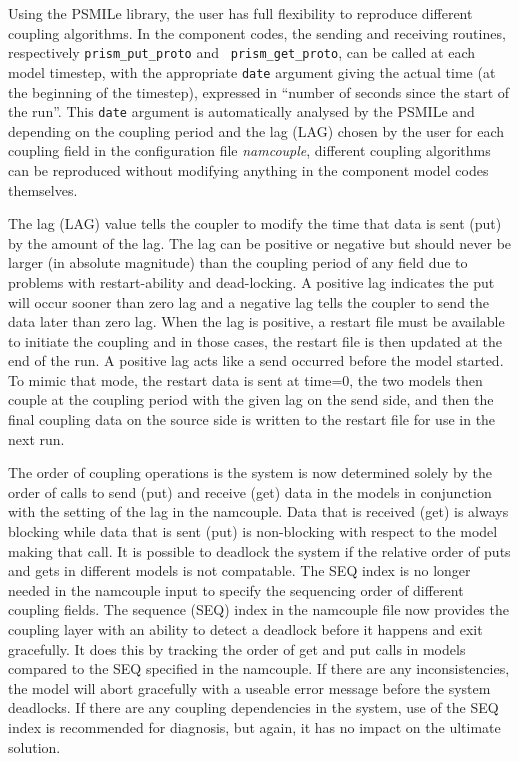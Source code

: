 Using the PSMILe library, the user has full flexibility to reproduce
different coupling algorithms. In the component codes, the sending and
receiving routines, respectively {\tt prism\_put\_proto} and {\tt
  prism\_get\_proto}, can be called at each model timestep, with the
appropriate {\tt date} argument giving the actual time (at the
beginning of the timestep), expressed in ``number of seconds since the
start of the run''. This {\tt date} argument is automatically analysed
by the PSMILe
and depending on the coupling period and the lag (LAG) chosen by the 
user for each coupling field in the configuration file {\it namcouple}, different
coupling algorithms can be reproduced without modifying anything in the
component model codes themselves. 

The lag (LAG) value tells the coupler to modify the time that data
is sent (put) by the amount of the lag.  The lag can be positive or
negative but should never be larger (in absolute magnitude) than the
coupling period of any field due to problems with restart-ability and
dead-locking.  A positive lag indicates the
put will occur sooner than zero lag and a negative lag tells the coupler
to send the data later than zero lag.  When the lag is positive, 
a restart file must be available to initiate the coupling and in those cases, 
the restart file is then updated at the end of the run.  A positive
lag acts like a send occurred before the model started.  To mimic that
mode, the restart data is sent at time=0, the two models then couple at the coupling
period with the given lag on the send side, and then the final coupling
data on the source side is written to the restart file for use in the
next run.  

The order of coupling operations is the system is now determined solely
by the order of calls to send (put) and receive (get) data in the models
in conjunction with the setting of the lag in the namcouple.  Data that is
received (get) is always blocking while data that is sent (put) is non-blocking
with respect to the model making that call.  It is possible
to deadlock the system if the relative order of puts and gets in different
models is not compatable.  The SEQ index is no longer needed in the namcouple
input to specify the sequencing order of different coupling fields.
The sequence (SEQ) index in the namcouple file now provides the coupling 
layer with an ability to detect a deadlock before it happens and exit 
gracefully.  It does this by tracking the order of get and put calls in
models compared to the SEQ specified in the namcouple.  If there are any
inconsistencies, the model will abort gracefully with a useable error
message before the system deadlocks.  If there are any coupling dependencies
in the system, use of the SEQ index is recommended for diagnosis, but again,
it has no impact on the ultimate solution.

